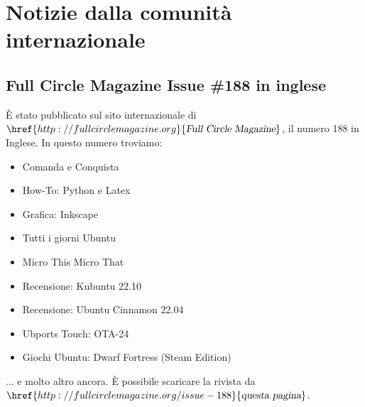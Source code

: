 \documentclass[a4paper,twoside]{article}
\begin{document}
\section{Notizie dalla comunità internazionale}
\subsection{Full Circle Magazine Issue \#188 in inglese}
È stato pubblicato sul sito internazionale di $\href{http://fullcirclemagazine.org}{\textsl{Full Circle Magazine}}$, il numero 188 in Inglese. In questo numero troviamo:

\begin{itemize}
\item Comanda e Conquista
\item How-To: Python e Latex
\item Grafica: Inkscape
\item Tutti i giorni Ubuntu
\item Micro This Micro That
\item Recensione: Kubuntu 22.10
\item Recensione: Ubuntu Cinnamon 22.04
\item Ubports Touch: OTA-24
\item Giochi Ubuntu: Dwarf Fortress (Steam Edition)
\end{itemize}

... e molto altro ancora.
È possibile scaricare la rivista da $\href{http://fullcirclemagazine.org/issue-188}{\textsl{questa pagina}}$.
\end{document}
